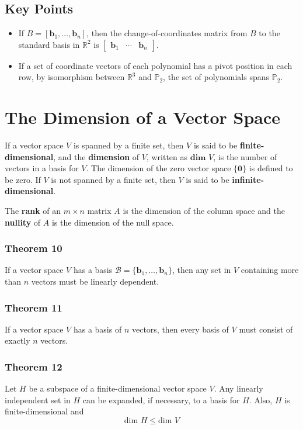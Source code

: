 \documentclass{article}
\begin{document}
\subsection*{Key Points}
\begin{itemize}
    \item If $B=\left[ \mathbf{b}_1, \ldots, \mathbf{b}_n\right]$, then the change-of-coordinates
    matrix from $B$ to the standard basis in $\mathbb{R}^2$ is
    $\begin{bmatrix} \mathbf{b}_1 & \cdots & \mathbf{b}_n\end{bmatrix}$.
    \item If a set of coordinate vectors of each polynomial has a pivot position in each row, by
    isomorphism between $\mathbb{R}^3$ and $\mathbb{P}_2$, the set of polynomials spans
    $\mathbb{P}_2$. 
\end{itemize}

\section*{The Dimension of a Vector Space}
If a vector space $V$ is spanned by a finite set, then $V$ is said to be \textbf{finite-dimensional}, and the \textbf{dimension} of $V$, written as $\textbf{dim }V$, is the number of vectors in a basis for $V$. The dimension of the zero vector space $\{\mathbf{0}\}$ is defined to be zero. If $V$ is not spanned by a finite set, then $V$ is said to be \textbf{infinite-dimensional}.

\vspace{1em}

The \textbf{rank} of an $m\times n$ matrix $A$ is the dimension of the column space and the \textbf{nullity} of $A$ is the dimension of the null space.

\subsubsection*{Theorem 10}
If a vector space $V$ has a basis $\mathcal{B}=\{\mathbf{b}_1,\ldots, \mathbf{b}_n\}$, then any set in $V$ containing more than $n$ vectors must be linearly dependent.

\subsubsection*{Theorem 11}
If a vector space $V$ has a basis of $n$ vectors, then every basis of $V$ must consist of exactly $n$ vectors.

\subsubsection*{Theorem 12}
Let $H$ be a subspace of a finite-dimensional vector space $V$. Any linearly independent set in $H$ can be expanded, if necessary, to a basis for $H$. Also, $H$ is finite-dimensional and \[\text{dim }H\leq \text{dim }V\]
\end{document}
